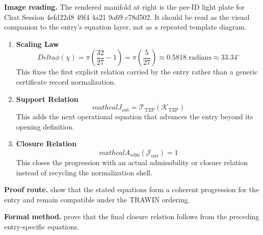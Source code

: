 \begin{samepage}
\noindent\begin{minipage}[t]{0.45\linewidth}
\vspace{0pt}
\raggedright
\scriptsize\textbf{Image reading.} The rendered manifold at right is the per-ID light plate for Chat Session 4efd22d8 49f4 4a21 9a69 c78d502. It should be read as the visual companion to the entry's equation layer, not as a repeated template diagram.\par
\end{minipage}\hfill
\begin{minipage}[t]{0.53\linewidth}
\vspace*{-0.10in}
\raggedright
{}
\end{minipage}
\end{samepage}

\clearpage


\begin{enumerate}[leftmargin=1.6em,itemsep=9pt,topsep=6pt]
\item \textbf{Scaling Law}
\[
Delta\phi(\chi) = \pi\left(\frac{32}{27} - 1\right) = \pi\left(\frac{5}{27}\right) \approx 0.5818 \text{ radians} \approx 33.34^\circ
\]
This fixes the first explicit relation carried by the entry rather than a generic certificate record normalization.

\item \textbf{Support Relation}
\[
mathcal{J}_{\mathrm{out}} = \mathcal{T}_{\mathrm{TZP}}\!\left(\mathcal{K}_{\mathrm{TZP}}\right)
\]
This adds the next operational equation that advances the entry beyond its opening definition.

\item \textbf{Closure Relation}
\[
mathcal{A}_{\mathrm{adm}}\!\left(\mathcal{J}_{\mathrm{out}}\right)=1
\]
This closes the progression with an actual admissibility or closure relation instead of recycling the normalization shell.
\end{enumerate}

\textbf{Proof route.} show that the stated equations form a coherent progression for the entry and remain compatible under the TRAWIN ordering.

\textbf{Formal method.} prove that the final closure relation follows from the preceding entry-specific equations.

